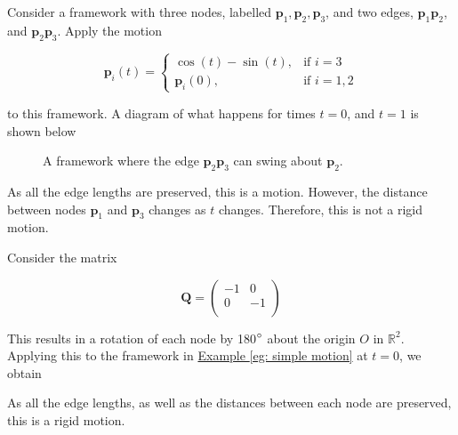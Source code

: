 \begin{example}
\label{eg: simple motion}
Consider a framework with three nodes, labelled $\textbf{p}_1, \textbf{p}_2, \textbf{p}_3$, and two edges, $\textbf{p}_1\textbf{p}_2$, and $\textbf{p}_2\textbf{p}_3$. Apply the motion 

\[ \textbf{p}_i(t) = 
\begin{cases}
    \cos(t) - \sin(t), & \text{if } i = 3 \\
    \textbf{p}_i(0), & \text{if } i = 1,2
\end{cases}
\]

\vspace{3 mm}
\noindent
to this framework. A diagram of what happens for times $t=0$, and $t=1$ is shown below

    \begin{figure}[htbp]
        \centering
        
        \caption{A framework where the edge $\textbf{p}_2\textbf{p}_3$ can swing about $\textbf{p}_2$.}
        \label{fig: simple motion}
    \end{figure}
\vspace{-5 mm}
\begin{flushleft}
As all the edge lengths are preserved, this is a motion. However, the distance between nodes $\textbf{p}_1$ and $\textbf{p}_3$ changes as $t$ changes. Therefore, this is not a rigid motion.    
\end{flushleft}
\end{example}

\begin{example}
Consider the matrix 

\[ \mathbf{Q} = 
\begin{pmatrix}
-1 & 0\\
0 & -1\\
\end{pmatrix}
\]

\begin{flushleft}
This results in a rotation of each node by 180$\degree$ about the origin $O$ in $\mathbb{R}^2$. Applying this to the framework in \hyperref[eg: simple motion]{Example \ref*{eg: simple motion}} at $t = 0$, we obtain

\begin{figure}[htbp]
    \centering
    
\end{figure}

As all the edge lengths, as well as the distances between each node are preserved, this is a rigid motion.    
\end{flushleft}
\end{example}

